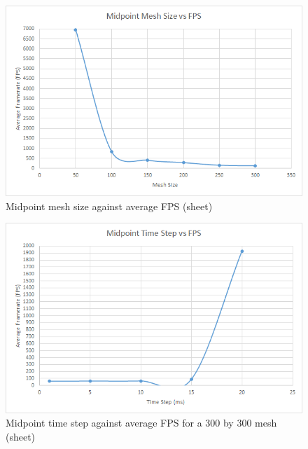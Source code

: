     \begin{figure}
    \begin{center}
      \includegraphics[scale=.9]{Figures/sheet_m_m_fps}
    \end{center}
    \caption{Midpoint mesh size against average FPS (sheet)}
    \label{fig:m mesh fps sheet}
  \end{figure}
  
    \begin{figure}
    \begin{center}
      \includegraphics[scale=.9]{Figures/sheet_m_ts_fps}
    \end{center}
    \caption{Midpoint time step against average FPS for a 300 by 300 mesh (sheet)}
    \label{fig:m step fps sheet}
  \end{figure}
  
